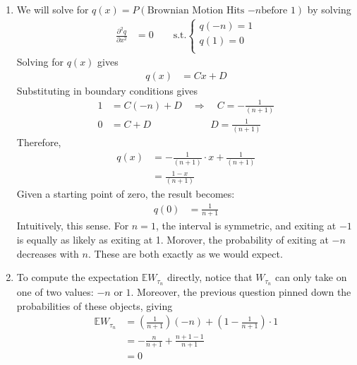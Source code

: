 \documentclass[12pt]{article}
\theoremstyle{plain}
\theoremstyle{definition}
\theoremstyle{remark}
\begin{document}
\begin{enumerate}
\begin{enumerate}
      \item %
        We will solve for $q(x) = P(\text{Brownian Motion Hits $-n$
        before 1})$ by solving
        \begin{align*}
          \frac{\partial^2 q}{\partial x^2}
          &= 0
          \qquad
          \text{s.t.}
          \begin{cases}
            q(-n) = 1 \\
            q(1)  = 0 \\
          \end{cases}
        \end{align*}
        Solving for $q(x)$ gives
        \begin{align*}
          q(x) &= Cx + D
        \end{align*}
        Substituting in boundary conditions gives
        \begin{align*}
          1 &= C(-n) + D
          \quad \Rightarrow \quad
          C = -\frac{1}{(n+1)}\\
          0 &= C + D
          \quad\qquad\qquad\quad
          D = \frac{1}{(n+1)}
        \end{align*}
        Therefore,
        \begin{align*}
          q(x) &= -\frac{1}{(n+1)}\cdot x + \frac{1}{(n+1)}\\
               &= \frac{1-x}{(n+1)}
        \end{align*}
        Given a starting point of zero, the result becomes:
        \begin{align*}
          q(0) &= \frac{1}{n+1}
        \end{align*}
        Intuitively, this sense. For $n=1$, the interval is symmetric,
        and exiting at $-1$ is equally as likely as exiting at 1.
        Morover, the probability of exiting at $-n$ decreases with $n$.
        These are both exactly as we would expect.

      \item %
        To compute the expectation $\mathbb{E}W_{\tau_n}$ directly,
        notice that $W_{\tau_n}$ can only take on one of two values:
        $-n$ or $1$. Moreover, the previous question pinned down the
        probabilities of these objects, giving
        \begin{align*}
          \mathbb{E}W_{\tau_n}
          &=
          \left(\frac{1}{n+1}\right)(-n)
          + \left(1-\frac{1}{n+1}\right)\cdot 1\\
          &=
          -\frac{n}{n+1}
          + \frac{n+1 - 1}{n+1}\\
          &= 0
        \end{align*}
    \end{enumerate}


\end{enumerate}
\end{document}
